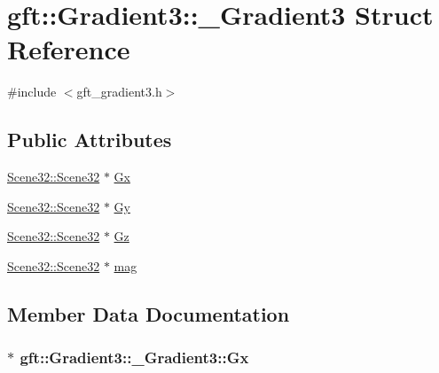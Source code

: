 \hypertarget{structgft_1_1Gradient3_1_1__Gradient3}{}\section{gft\+:\+:Gradient3\+:\+:\+\_\+\+Gradient3 Struct Reference}
\label{structgft_1_1Gradient3_1_1__Gradient3}


{\ttfamily \#include $<$gft\+\_\+gradient3.\+h$>$}

\subsection*{Public Attributes}
\begin{DoxyCompactItemize}
\item 
\hyperlink{namespacegft_1_1Scene32_ae492ac529c9149889605a7bebd647c46}{Scene32\+::\+Scene32} $\ast$ \hyperlink{structgft_1_1Gradient3_1_1__Gradient3_a0f0004e4f69ca93c57dbdd5ef750b673}{Gx}
\item 
\hyperlink{namespacegft_1_1Scene32_ae492ac529c9149889605a7bebd647c46}{Scene32\+::\+Scene32} $\ast$ \hyperlink{structgft_1_1Gradient3_1_1__Gradient3_ae929510403073f2e3398652e1caeb9ca}{Gy}
\item 
\hyperlink{namespacegft_1_1Scene32_ae492ac529c9149889605a7bebd647c46}{Scene32\+::\+Scene32} $\ast$ \hyperlink{structgft_1_1Gradient3_1_1__Gradient3_a565c66b7cb3f64c121a40149132508f7}{Gz}
\item 
\hyperlink{namespacegft_1_1Scene32_ae492ac529c9149889605a7bebd647c46}{Scene32\+::\+Scene32} $\ast$ \hyperlink{structgft_1_1Gradient3_1_1__Gradient3_adb0a7878ed7937b3112430914f40ed2d}{mag}
\end{DoxyCompactItemize}


\subsection{Member Data Documentation}
\subsubsection[{\texorpdfstring{Gx}{Gx}}]{$\ast$ gft\+::\+Gradient3\+::\+\_\+\+Gradient3\+::\+Gx}\hypertarget{structgft_1_1Gradient3_1_1__Gradient3_a0f0004e4f69ca93c57dbdd5ef750b673}{}\label{structgft_1_1Gradient3_1_1__Gradient3_a0f0004e4f69ca93c57dbdd5ef750b673}
